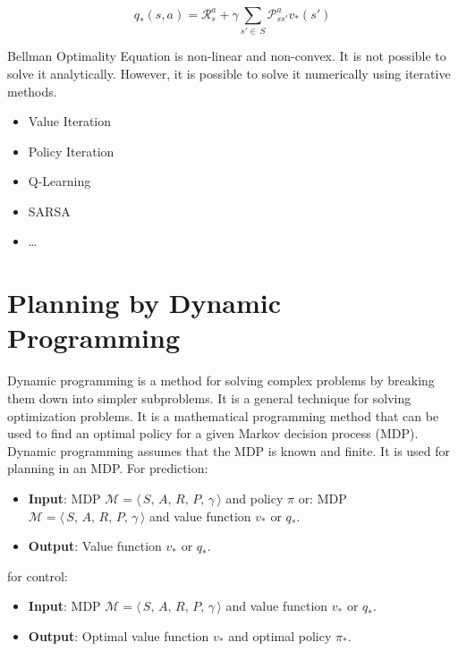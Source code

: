 \begin{itemize}

\[
    q_*(s,a) = \mathcal{R}_{s}^{a} + \gamma\sum_{s'\in\,S}\mathcal{P}_{ss'}^{a}v_*(s')
\]

Bellman Optimality Equation is non-linear and non-convex.
It is not possible to solve it analytically.
However, it is possible to solve it numerically using iterative methods.
\begin{itemize}
    \item Value Iteration
    \item Policy Iteration
    \item Q-Learning
    \item SARSA
    \item \ldots
\end{itemize}


\section{Planning by Dynamic Programming}\label{sec:planning-by-dynamic-programming}
Dynamic programming is a method for solving complex problems by breaking them down into simpler subproblems.
It is a general technique for solving optimization problems.
It is a mathematical programming method that can be used to find an optimal policy for a given Markov decision process (MDP).
Dynamic programming assumes that the MDP is known and finite.
It is used for planning in an MDP.
For prediction:
\begin{itemize}
    \item \textbf{Input}: MDP $\mathcal{M} = \langle\,S,\,A,\,R,\,P,\,\gamma\,\rangle$ and policy $\pi$
    or: MDP $\mathcal{M} = \langle\,S,\,A,\,R,\,P,\,\gamma\,\rangle$ and value function $v_*$ or $q_*$.
    \item \textbf{Output}: Value function $v_*$ or $q_*$.
\end{itemize}

for control:
\begin{itemize}
    \item \textbf{Input}: MDP $\mathcal{M} = \langle\,S,\,A,\,R,\,P,\,\gamma\,\rangle$ and value function $v_*$ or $q_*$.
    \item \textbf{Output}: Optimal value function $v_*$ and optimal policy $\pi_*$.
\end{itemize}



\end{itemize}

